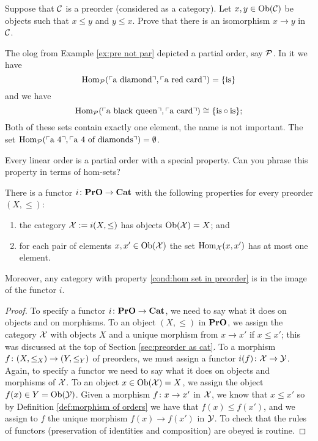 \begin{exercise}
Suppose that $\mathcal{C}$ is a preorder (considered as a category). Let $x,y\in\textnormal{Ob}(\mathcal{C})$ be objects such that $x\leq y$ and $y\leq x$. Prove that there is an isomorphism $x\to y$ in $\mathcal{C}$.
\end{exercise}

\begin{example}

The olog from Example \ref{ex:pre not par} depicted a partial order, say $\mathcal{P}$. In it we have $$\textnormal{Hom}_\mathcal{P}(\textnormal{$\ulcorner$a diamond$\urcorner$},\textnormal{$\ulcorner$a red card$\urcorner$})=\{\textnormal{is}\}$$ and we have $$\textnormal{Hom}_\mathcal{P}(\textnormal{$\ulcorner$a black queen$\urcorner$},\textnormal{$\ulcorner$a card$\urcorner$})\cong\{\textnormal{is}\circ\textnormal{is}\};$$ Both of these sets contain exactly one element, the name is not important. The set $\textnormal{Hom}_\mathcal{P}(\textnormal{$\ulcorner$a 4$\urcorner$},\textnormal{$\ulcorner$a 4 of diamonds$\urcorner$})=\emptyset$. 

\end{example}

\begin{exercise}
Every linear order is a partial order with a special property. Can you phrase this property in terms of hom-sets?
\end{exercise}

\begin{proposition}\label{prop:preorders to cats}

There is a functor $i\colon{\bf PrO}\rightarrow{\bf Cat}$ with the following properties for every preorder $(X,\leq)$:
\begin{enumerate}
\item the category $\mathcal{X}:=i(X,\leq)$ has objects $\textnormal{Ob}(\mathcal{X})=X$; and
\item \label{cond:hom set in preorder} for each pair of elements $x,x'\in\textnormal{Ob}(\mathcal{X})$ the set $\textnormal{Hom}_\mathcal{X}(x,x')$ has at most one element.
\end{enumerate}
Moreover, any category with property \ref{cond:hom set in preorder} is in the image of the functor $i$.

\end{proposition}

\begin{proof}

To specify a functor $i\colon{\bf PrO}\rightarrow{\bf Cat}$, we need to say what it does on objects and on morphisms. To an object $(X,\leq)$ in ${\bf PrO}$, we assign the category $\mathcal{X}$ with objects $X$ and a unique morphism from $x\to x'$ if $x\leq x'$; this was discussed at the top of Section \ref{sec:preorder as cat}. To a morphism $f\colon(X,\leq_X)\rightarrow(Y,\leq_Y)$ of preorders, we must assign a functor $i(f)\colon\mathcal{X}\rightarrow\mathcal{Y}$. Again, to specify a functor we need to say what it does on objects and morphisms of $\mathcal{X}$. To an object $x\in\textnormal{Ob}(\mathcal{X})=X$, we assign the object $f(x)\in Y=\textnormal{Ob}(\mathcal{Y})$. Given a morphism $f\colon x\rightarrow x'$ in $\mathcal{X}$, we know that $x\leq x'$ so by Definition \ref{def:morphism of orders} we have that $f(x)\leq f(x')$, and we assign to $f$ the unique morphism $f(x)\to f(x')$ in $\mathcal{Y}$. To check that the rules of functors (preservation of identities and composition) are obeyed is routine.

\end{proof}

